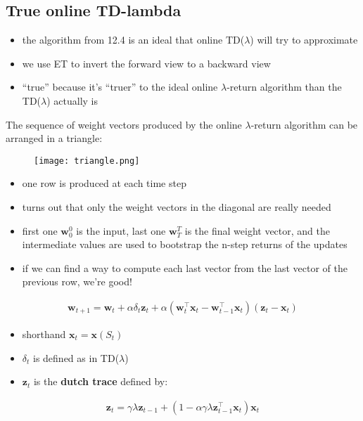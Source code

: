 \documentclass[sutton_barto_notes.tex]{subfiles}
\begin{document}
\subsection{True online TD-lambda}

\begin{itemize}
\item the algorithm from 12.4 is an ideal that online TD($\lambda$) will try to approximate 
\item we use ET to invert the forward view to a backward view 
\item “true” because it’s “truer” to the ideal online $\lambda$-return algorithm than the TD($\lambda$) actually is 
\end{itemize}
 The sequence of weight vectors produced by the online $\lambda$-return algorithm can be arranged in a triangle: 
\begin{figure}[h!]
    \centering
     \texttt{[image: triangle.png]}
\end{figure}
\begin{itemize}
\item one row is produced at each time step 
\item turns out that only the weight vectors in the diagonal are really needed 
\item first one $\mathbf{w}_0^0$ is the input, last one $\mathbf{w}_T^T$ is the final weight vector, and the intermediate values are used to bootstrap the n-step returns of the updates 
\item if we can find a way to compute each last vector from the last vector of the previous row, we’re good! 
\end{itemize}
\begin{align}\mathbf{w}_{t+1} = \mathbf{w}_t + \alpha \delta_t \mathbf{z}_t + \alpha (\mathbf{w}_t^{\top} \mathbf{x}_t - \mathbf{w}_{t-1}^{\top} \mathbf{x}_t) (\mathbf{z}_t - \mathbf{x}_t) \label{eq:12.10}\tag{12.10}\end{align}
\begin{itemize}
\item shorthand $\mathbf{x}_t = \mathbf{x}(S_t)$ 
\item $\delta_t$ is defined as in TD($\lambda$) 
\item $\mathbf{z}_t$ is the \textbf{dutch trace} defined by: 
\end{itemize}
\begin{align}\mathbf{z}_t = \gamma \lambda \mathbf{z}_{t-1} + (1 - \alpha \gamma \lambda \mathbf{z}_{t-1}^{\top} \mathbf{x}_t) \mathbf{x}_t \label{eq:12.11}\tag{12.11}\end{align}
\end{document}
